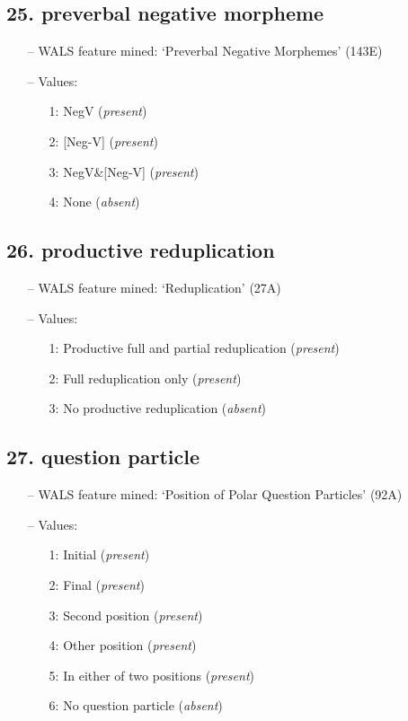 \subsection*{25. preverbal negative morpheme}

\begin{itemize}
\item[--] WALS feature mined: `Preverbal Negative Morphemes' (143E)
\item[--] Values:

\begin{enumerate}
\item[1:] NegV (\emph{present})
\item[2:] [Neg-V] (\emph{present})
\item[3:] NegV\&[Neg-V] (\emph{present})
\item[4:] None (\emph{absent})
\end{enumerate}
\end{itemize}

\subsection*{26. productive reduplication}

\begin{itemize}
\item[--] WALS feature mined: `Reduplication' (27A)
\item[--] Values:

\begin{enumerate}
\item[1:] Productive full and partial reduplication (\emph{present})
\item[2:] Full reduplication only (\emph{present})
\item[3:] No productive reduplication (\emph{absent})
\end{enumerate}
\end{itemize}

\subsection*{27. question particle}

\begin{itemize}
\item[--] WALS feature mined: `Position of Polar Question Particles' (92A)
\item[--] Values:

\begin{enumerate}
\item[1:] Initial (\emph{present})
\item[2:] Final (\emph{present})
\item[3:] Second position (\emph{present})
\item[4:] Other position (\emph{present})
\item[5:] In either of two positions (\emph{present})
\item[6:] No question particle (\emph{absent})
\end{enumerate}
\end{itemize}

